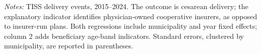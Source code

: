 
\begin{table}[H]
   \caption{\label{tab:modality} \textbf{Physician-owned cooperative insurers and cesarean delivery}}
   \centering
\small\setlength{\tabcolsep}{5pt}
\begin{minipage}{\linewidth}\footnotesize
\textit{Notes:} TISS delivery events, 2015--2024. The outcome is cesarean delivery; the explanatory indicator identifies physician-owned cooperative insurers, as opposed to insurer-run plans. Both regressions include municipality and year fixed effects; column 2 adds beneficiary age-band indicators. Standard errors, clustered by municipality, are reported in parentheses.
\end{minipage}
\end{table}


